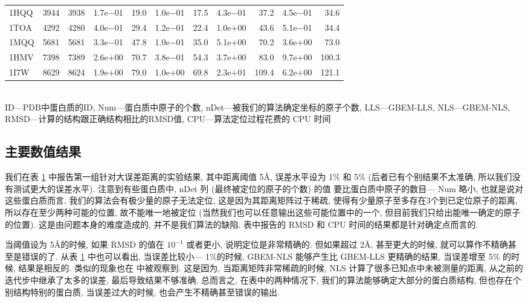 \documentclass{CASthesis_zzk}
\begin{document}
\begin{table}[!htbp]
{\begin{tabular}{lrrrrrrrrrr}
      1HQQ & 3944 & 3938 & 1.7e$-$01 & 19.0 & 1.0e$-$01 & 17.5 & 4.3e$-$01 &  37.2 & 4.5e$-$01&  34.6  \\
      1TOA & 4292 & 4280 & 4.0e$-$01 & 29.4 & 1.2e$-$01 & 22.4 & 1.0e$+$00 &  43.6 & 5.1e$-$01&  34.4  \\
      1MQQ & 5681 & 5681 & 3.3e$-$01 & 47.8 & 1.0e$-$01 & 35.0 & 5.1e$+$00 &  70.2 & 3.6e$+$00&  73.0  \\
      1HMV & 7398 & 7389 & 2.6e$+$00 & 70.7 & 3.8e$-$01 & 54.3 & 3.7e$+$00 &  83.0 & 9.7e$+$00& 100.3  \\
      1I7W & 8629 & 8624 & 1.9e$+$00 & 79.0 & 1.0e$+$00 & 69.8 & 2.3e$+$01 & 109.4 & 6.2e$+$00& 121.1  \\ \toprule
    \end{tabular}\\[-4mm]
    \label{table:cut5}
    \bl *ID---PDB中蛋白质的ID, Num---蛋白质中原子的个数, nDet---被我们的算法确定坐标的原子个数, LLS---GBEM-LLS, NLS---GBEM-NLS, RMSD---计算的结构跟正确结构相比的RMSD值, CPU---算法定位过程花费的 CPU 时间 \el
  }
\end{table}

\subsection{主要数值结果}
我们在表 \ref{table:cut5} 中报告第一组针对大误差距离的实验结果,
其中距离阈值 5\AA, 误差水平设为 1\% 和 5\% 
(后者已有个别结果不太准确, 所以我们没有测试更大的误差水平). 
注意到有些蛋白质中,  nDet 列 (最终被定位的原子的个数) 的值 
要比蛋白质中原子的数目--- Num 略小,
也就是说对这些蛋白质而言, 我们的算法会有极少量的原子无法定位,
这是因为其距离矩阵过于稀疏, 使得有少量原子至多存在3个到已定位原子的距离,
所以存在至少两种可能的位置, 故不能唯一地被定位 
(当然我们也可以任意输出这些可能位置中的一个, 但目前我们只给出能唯一确定的原子的位置). 这是由问题本身的难度造成的, 并不是我们算法的缺陷.
表中报告的 RMSD 和 CPU 时间的结果都是针对确定点而言的.

当阈值设为 5\AA 的时候, 如果 RMSD 的值在 $10^{-1}$ 或者更小,
说明定位是非常精确的.
但如果超过 2\AA, 甚至更大的时候, 就可以算作不精确甚至是错误的了.
从表 \ref{table:cut5} 中也可以看出, 当误差比较小--- 1\%的时候,
GBEM-NLS 能够产生比 GBEM-LLS 更精确的结果, 
当误差增至 5\% 的时候, 结果是相反的.
类似的现象也在 \cite{Sit2009} 中被观察到.
这是因为, 当距离矩阵非常稀疏的时候, 
NLS 计算了很多已知点中未被测量的距离, 从之前的迭代步中继承了太多的误差,
最后导致结果不够准确.
总而言之, 在表中的两种情况下, 我们的算法能够确定大部分的蛋白质结构,
但也存在个别结构特别的蛋白质, 当误差过大的时候,
也会产生不精确甚至错误的输出.
\end{document}
